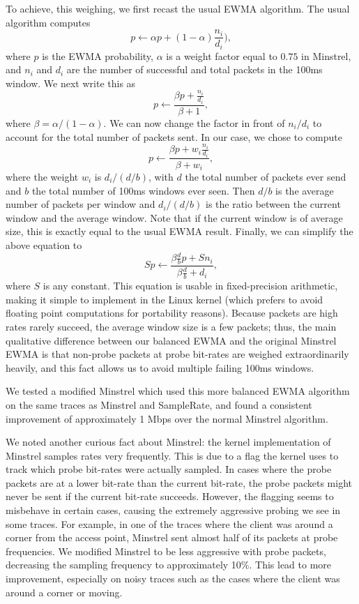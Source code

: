 \documentclass[twocolumn,10pt]{article}
\begin{document}
To achieve, this weighing, we first recast the usual EWMA algorithm.
The usual algorithm computes $$p \gets \alpha p + (1 - \alpha)
\frac{n_i}{d_i}),$$ where $p$ is the EWMA probability, $\alpha$ is a
weight factor equal to $0.75$ in Minstrel, and $n_i$ and $d_i$ are the
number of successful and total packets in the 100ms window.  We next
write this as $$p \gets \frac{\beta p + \frac{n_i}{d_i}}{\beta + 1},$$
where $\beta = \alpha / (1 - \alpha)$.  We can now change the factor
in front of $n_i / d_i$ to account for the total number of packets
sent.  In our case, we chose to compute $$p \gets \frac{\beta p + w_i
  \frac{n_i}{d_i}}{\beta + w_i},$$ where the weight $w_i$ is $d_i / (d
/ b)$, with $d$ the total number of packets ever send and $b$ the
total number of 100ms windows ever seen.  Then $d / b$ is the average
number of packets per window and $d_i / (d / b)$ is the ratio between
the current window and the average window.  Note that if the current
window is of average size, this is exactly equal to the usual EWMA
result.  Finally, we can simplify the above equation to $$S p \gets
\frac{\beta \frac{d}{b} p + S n_i}{\beta \frac{d}{b} + d_i},$$ where
$S$ is any constant.  This equation is usable in fixed-precision
arithmetic, making it simple to implement in the Linux kernel (which
prefers to avoid floating point computations for portability reasons).
Because packets are high rates rarely succeed, the average window size
is a few packets; thus, the main qualitative difference between our
balanced EWMA and the original Minstrel EWMA is that non-probe packets
at probe bit-rates are weighed extraordinarily heavily, and this fact
allows us to avoid multiple failing 100ms windows.

We tested a modified Minstrel which used this more balanced EWMA
algorithm on the same traces as Minstrel and SampleRate, and found a
consistent improvement of approximately 1 Mbps over the normal
Minstrel algorithm.

We noted another curious fact about Minstrel: the kernel
implementation of Minstrel samples rates very frequently.  This is due
to a flag the kernel uses to track which probe bit-rates were actually
sampled.  In cases where the probe packets are at a lower bit-rate
than the current bit-rate, the probe packets might never be sent if
the current bit-rate succeeds.  However, the flagging seems to
misbehave in certain cases, causing the extremely aggressive probing
we see in some traces.  For example, in one of the traces where the
client was around a corner from the access point, Minstrel sent almost
half of its packets at probe frequencies.  We modified Minstrel to be
less aggressive with probe packets, decreasing the sampling frequency
to approximately 10\%.  This lead to more improvement, especially on
noisy traces such as the cases where the client was around a corner or
moving.
\end{document}
